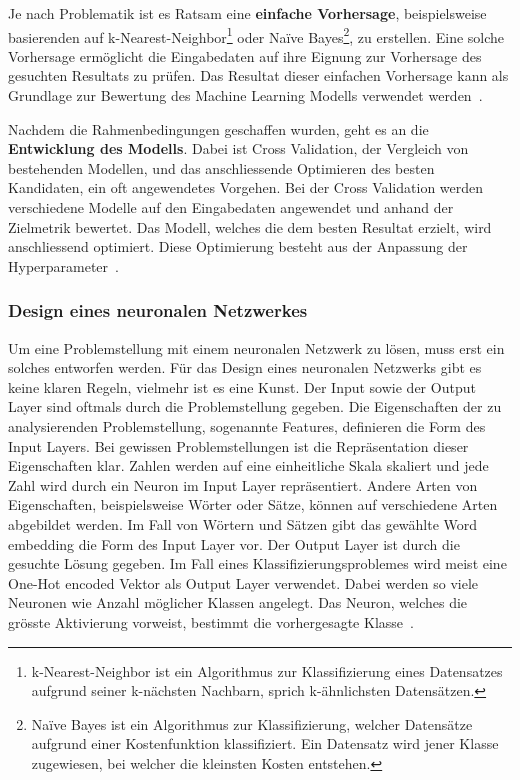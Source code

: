Je nach Problematik ist es Ratsam eine \textbf{einfache Vorhersage}, beispielsweise basierenden auf k-Nearest-Neighbor\footnote{k-Nearest-Neighbor ist ein Algorithmus zur Klassifizierung eines Datensatzes aufgrund seiner k-nächsten Nachbarn, sprich k-ähnlichsten Datensätzen.} oder Naïve Bayes\footnote{Naïve Bayes ist ein Algorithmus zur Klassifizierung, welcher Datensätze aufgrund einer Kostenfunktion klassifiziert. Ein Datensatz wird jener Klasse zugewiesen, bei welcher die kleinsten Kosten entstehen.}, zu erstellen. Eine solche Vorhersage ermöglicht die Eingabedaten auf ihre Eignung zur Vorhersage des gesuchten Resultats zu prüfen. Das Resultat dieser einfachen Vorhersage kann als Grundlage zur Bewertung des Machine Learning Modells verwendet werden~\autocite{DesignMLSecondaryCite}.

Nachdem die Rahmenbedingungen geschaffen wurden, geht es an die \textbf{Entwicklung des Modells}. Dabei ist Cross Validation, der Vergleich von bestehenden Modellen, und das anschliessende Optimieren des besten Kandidaten, ein oft angewendetes Vorgehen. Bei der Cross Validation werden verschiedene Modelle auf den Eingabedaten angewendet und anhand der Zielmetrik bewertet. Das Modell, welches die dem besten Resultat erzielt, wird anschliessend optimiert. Diese Optimierung besteht aus der Anpassung der Hyperparameter~\autocite{DesignML}.

\subsubsection{Design eines neuronalen Netzwerkes}

Um eine Problemstellung mit einem neuronalen Netzwerk zu lösen, muss erst ein solches entworfen werden. Für das Design eines neuronalen Netzwerks gibt es keine klaren Regeln, vielmehr ist es eine Kunst. Der Input sowie der Output Layer sind oftmals durch die Problemstellung gegeben. Die Eigenschaften der zu analysierenden Problemstellung, sogenannte Features, definieren die Form des Input Layers. Bei gewissen Problemstellungen ist die Repräsentation dieser Eigenschaften klar. Zahlen werden auf eine einheitliche Skala skaliert und jede Zahl wird durch ein Neuron im Input Layer repräsentiert. Andere Arten von Eigenschaften, beispielsweise Wörter oder Sätze, können auf verschiedene Arten abgebildet werden. Im Fall von Wörtern und Sätzen gibt das gewählte Word embedding die Form des Input Layer vor. Der Output Layer ist durch die gesuchte Lösung gegeben. Im Fall eines Klassifizierungsproblemes wird meist eine One-Hot encoded Vektor als Output Layer verwendet. Dabei werden so viele Neuronen wie Anzahl möglicher Klassen angelegt. Das Neuron, welches die grösste Aktivierung vorweist, bestimmt die vorhergesagte Klasse~\autocite{NNDesign}.

